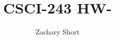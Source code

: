 \documentclass{article}
\title{CSCI-243 HW-}
\author{Zachary Short}
\begin{document}
\maketitle

\section{}
    \subsection{}
    \subsection{}
\section{}
    \subsection{}
    \subsection{}
\section{}
    \subsection{} 
    \subsection{} 
\section{}
    \subsection{}
    \subsection{}
\end{document}

